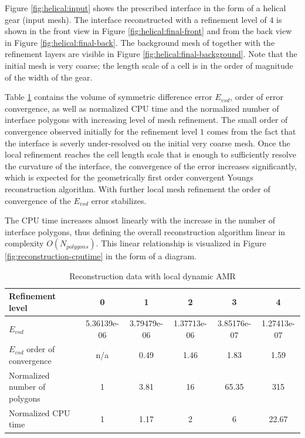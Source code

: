 Figure \ref{fig:helical:input} shows the prescribed interface in the form of a
helical gear (input mesh). The interface reconstructed with a refinement
level of $4$ is shown in the front view in Figure \ref{fig:helical:final-front}
and from the back view in Figure \ref{fig:helical:final-back}. The background mesh
of together with the refinement layers are visible in Figure
\ref{fig:helical:final-background}. Note that the initial mesh is very coarse;
the length scale of a cell is in the order of magnitude of the width of the
gear. 

Table \ref{tab:amr:reconstruction} contains the volume of symmetric difference
error $E_{vsd}$, order of error convergence, as well as normalized CPU time
and the normalized number of interface polygons with increasing level of mesh
refinement. The small order of convergence observed initially for the refinement 
level $1$ comes from the fact that the interface is severly under-resolved on the
initial very coarse  mesh. Once the local refinement reaches the cell length
scale that is enough to sufficiently resolve the curvature of the interface,
the convergence of the error increases significantly, which is expected for the
geometrically first order convergent Youngs reconstruction algorithm. With
further local mesh refinement the order of convergence of the $E_{vsd}$ error
stabilizes. 

The CPU time increases almost linearly with the increase in the number of
interface polygons, thus defining the overall reconstruction algorithm linear
in complexity $O(N_{polygons})$. This linear relationship is visualized in
Figure \ref{fig:reconstruction-cputime} in the form of a diagram.

\begin{table} 
\footnotesize
\centering 
\caption{Reconstruction data with local dynamic AMR} 
\label{tab:amr:reconstruction} 
    \begin{tabular}{l c c c c c } 
          \toprule
          Refinement level & 0 & 1 & 2 & 3 & 4\\ 
          \hline
          \hline
          $E_{vsd}$                             & 5.36139e-06 & 3.79479e-06 & 1.37713e-06 & 3.85176e-07 & 1.27413e-07 \\  
          $E_{vsd}$ order of convergence        & n/a & 0.49 & 1.46 & 1.83  & 1.59 \\  
          Normalized number of polygons         & 1 & 3.81 & 16 & 65.35  & 315 \\ 
          Normalized CPU time                   & 1 & 1.17 & 2 & 6 & 22.67 \\ 
          \bottomrule
    \end{tabular}
\end{table}

